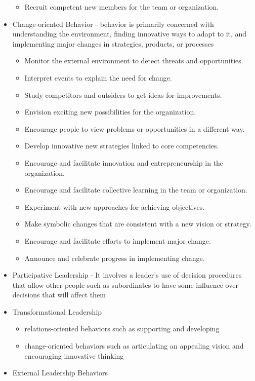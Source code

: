 \begin{itemize}
\begin{itemize}
		\item Recruit competent new members for the team or organization.
	\end{itemize}
	\item Change-oriented Behavior - behavior is primarily concerned with understanding the environment, finding innovative ways to adapt to it, and implementing major changes in strategies, products, or processes
	\begin{itemize}
		\item Monitor the external environment to detect threats and opportunities.
		\item Interpret events to explain the need for change.
		\item Study competitors and outsiders to get ideas for improvements.
		\item Envision exciting new possibilities for the organization.
		\item Encourage people to view problems or opportunities in a different way.
		\item Develop innovative new strategies linked to core competencies.
		\item Encourage and facilitate innovation and entrepreneurship in the organization.
		\item Encourage and facilitate collective learning in the team or organization.
		\item Experiment with new approaches for achieving objectives.
		\item Make symbolic changes that are consistent with a new vision or strategy.
		\item Encourage and facilitate efforts to implement major change.
		\item Announce and celebrate progress in implementing change.
	\end{itemize}
	\item Participative Leadership - It involves a leader’s use of decision procedures that allow other people such as subordinates to have some influence over decisions that will affect them
	\item Transformational Leadership
		\begin{itemize}
			\item relations-oriented behaviors such as supporting and developing
			\item change-oriented behaviors such as articulating an appealing vision and encouraging innovative thinking
		\end{itemize}
	\item External Leadership Behaviors

\end{itemize}
